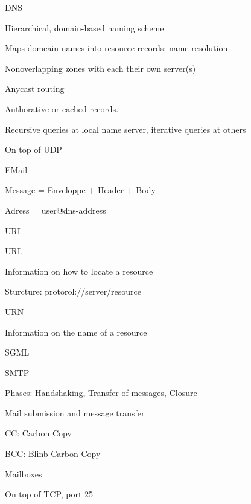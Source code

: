 \documentclass[main.tex]{subfiles}
\begin{document}
\begin{card}{DNS}
\item Hierarchical, domain-based naming scheme.
\item Maps domeain names into resource records: name resolution
\item Nonoverlapping zones with each their own server(s)
\item Anycast routing
\item Authorative or cached records.
\item Recursive queries at local name server, iterative queries at others
\item On top of UDP
\end{card}


\begin{card}{EMail}
\item Message = Enveloppe + Header + Body
\item Adress = user@dns-address
\end{card}


\begin{card}{URI}
\TODO
\end{card}


\begin{card}{URL}
\item Information on how to locate a resource
\item Sturcture: protorol://server/resource
\end{card}


\begin{card}{URN}
\item Information on the name of a resource
\end{card}


\begin{card}{SGML}
\TODO
\end{card}


\begin{card}{SMTP}
\item Phases: Handshaking, Transfer  of  messages, Closure
\item Mail submission and message transfer
\item CC: Carbon Copy
\item BCC: Blinb Carbon Copy
\item Mailboxes
\item On top of TCP, port 25
\end{card}
\end{document}
